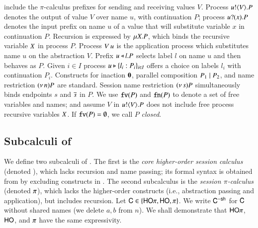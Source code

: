 include the
$\pi$-calculus prefixes for sending and receiving values $V$.
Process $u ! \langle V \rangle . P$ denotes the output of value $V$
over name $u$, with continuation $P$;
process $u ? (x) . P$ denotes the input prefix on name $u$ of a value
that 
will substitute variable $x$ in continuation $P$. 
Recursion is expressed by $\mu X. P$,
which binds the recursive variable $X$ in process $P$.
Process 
$V\, {u}$ 
is the application
process which substitutes name $u$ on the abstraction $V$. 
Prefix $u \triangleleft l . P$ selects label $l$ on name $u$ and then behaves as $P$.
Given $i \in I$ process $u \triangleright \{l_i: P_i\}_{i \in I}$ offers a choice on labels $l_i$ with
continuation $P_i$.
Constructs for 
inaction $\mathbf{0}$,  parallel composition $P_1 \;|\; P_2$, and 
name restriction $(\nu\, n) P$ are standard.
Session name restriction $(\nu\, s) P$ simultaneously binds endpoints $s$ and $\overline{s}$ in $P$.
We use $\mathtt{fv}(P)$ and $\mathtt{fn}(P)$ to denote a set of free variables and names; 
and assume $V$ in $u ! \langle V \rangle .{P}$ does not include free process recursive 
variables $X$. 
If $\mathtt{fv}(P) = \emptyset$, we call $P$ {\em closed}.

\subsection{Subcalculi of \HOp}
\label{subsec:subcalculi}
\noi
We define two subcalculi of \HOp. 
The first is the 
{\em core higher-order session calculus} (denoted \HO),
which lacks recursion and name passing; its 
formal syntax is obtained from  by excluding 
constructs in .
The second subcalculus is 
the {\em session $\pi$-calculus} 
(denoted $\pi$), which 
lacks  the
higher-order constructs
(i.e., abstraction passing and application), but includes recursion.
Let $\mathsf{C} \in \{\mathsf{HO}\pi, \mathsf{HO}, \pi\}$. We write 
$\mathsf{C}^{-\mathsf{sh}}$ for $\mathsf{C}$ without shared names
 (we delete $a,b$ from $n$). 
 We shall demonstrate that 
$\mathsf{HO}\pi$, $\mathsf{HO}$, and $\pi$ have the same expressivity.

